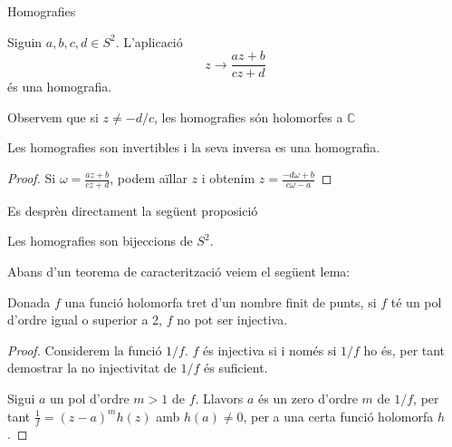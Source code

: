 \documentclass[dvipsnames, svgnames, leqno, a4paper, 12pt]{report}
\begin{document}
    \begin{chapter}{Homografies}
        \begin{definition}[Homografia]
            Siguin \(a,b,c,d\in S^2\). L'aplicació \begin{displaymath}
                z\to\frac{az+b}{cz+d}
            \end{displaymath}
            és una homografia.
        \end{definition}
        Observem que si \begin{math}
            z\neq -d/c
        \end{math}, les homografies són holomorfes a \begin{math}
            \mathbb{C}
        \end{math}
        \begin{proposition}
            Les homografies son invertibles i la seva inversa es una homografia.
        \end{proposition}
        \begin{proof}
            Si \begin{math}
                \omega = \frac{az+b}{cz+d} 
            \end{math}, podem aïllar $z$ i obtenim \begin{math}
                z = \frac{-d \omega+b}{c\omega-a}
            \end{math}
        \end{proof}
        Es desprèn directament la següent proposició
        \begin{proposition}
            Les homografies son bijeccions de $S^2$.
        \end{proposition}
        Abans d'un teorema de caracterització veiem el següent lema:
        \begin{lemma}
            Donada $f$  una funció holomorfa tret d'un nombre finit de punts, si $f$ té un pol d'ordre igual o superior a 2, $f$ no pot ser injectiva.  
        \end{lemma}
        \begin{proof}
            Considerem la funció $1/f$. $f$ és injectiva si i només si $1/f$ ho és, per tant demostrar la no injectivitat de $1/f$ és suficient.
            
            Sigui $a$ un pol d'ordre $m>1$ de $f$. Llavors $a$ és un zero d'ordre $m$ de $1/f$, per tant \begin{math}
                \frac{1}{f}=(z-a)^mh(z)
            \end{math} amb $h(a)\neq0$, per a una certa funció holomorfa $h$.


\end{proof}
\end{chapter}
\end{document}
